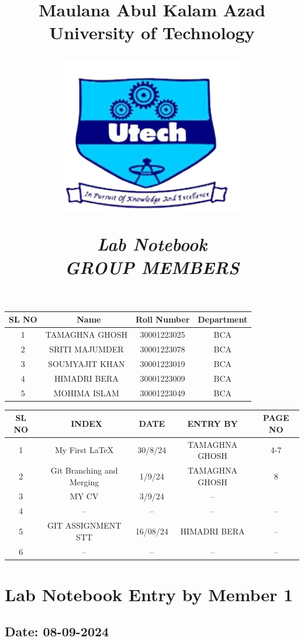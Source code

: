 \documentclass[12pt]{article}
\title{
    \vspace{0.2in}
    \Huge \textbf{Maulana Abul Kalam Azad University of Technology} \\
    \vspace{0.5in} %
    \begin{center}
        \includegraphics[width=0.6\textwidth]{Pic.png} %
    \end{center}
    \vspace{0.5in}
    \Huge\textbf{\textit{Lab Notebook}} \\
    \vspace{0.5in}
    \newpage
    \Large \textbf{\textit{GROUP MEMBERS}} \\
    \vspace{0.5in}
}
\date{}
\begin{document}
\maketitle

\begin{center}
    \begin{tabular}{|c| c | c | c |}
    \hline
    \textbf{SL NO}&\
    \textbf{Name} & \textbf{Roll Number} & \textbf{Department} \\
    \hline
    1 & TAMAGHNA GHOSH &30001223025 & BCA  \\
    \hline
    2& SRITI MAJUMDER & 30001223078 & BCA \\
    \hline
    3& SOUMYAJIT KHAN & 30001223019 & BCA   \\
    \hline
    4 & HIMADRI BERA & 30001223009 & BCA \\
    \hline
    5 & MOHIMA ISLAM & 30001223049 & BCA \\
    \hline
    \end{tabular}
\end{center}
\newpage
\begin{center}
    \begin{tabular}{|c|  c | c|c|c| }
    \hline
    \textbf{SL NO}&\
    \textbf{INDEX} & \textbf{DATE}&\textbf{ENTRY BY} &\textbf{PAGE NO} \\
    \hline
    1 & My First \LaTeX & 30/8/24&TAMAGHNA GHOSH & 4-7\\
    \hline
    2&Git Branching and Merging&1/9/24& TAMAGHNA GHOSH &8 \\
    \hline
    3&  MY CV & 3/9/24 & --&\\
    \hline
    4&   -- &-- &--&--\\
    5& GIT ASSIGNMENT STT & 16/08/24 & HIMADRI BERA &--\\
    6&--&--&--&--\\
    \end{tabular}
\end{center}

\newpage

\section{Lab Notebook Entry by Member 1}
\subsection*{Date: 08-09-2024}
\end{document}
